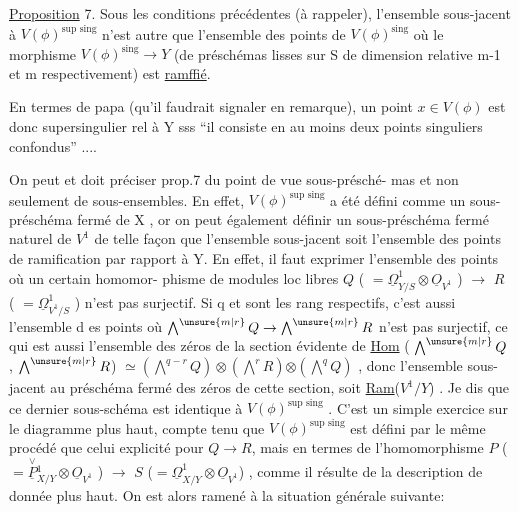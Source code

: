 
\uline{Proposition} 7. Sous les conditions précédentes (à rappeler), l'ensemble
sous-jacent à $V(\phi)^{\text{sup sing}}$ n'est autre que l'ensemble des points de
$V(\phi)^{\text{sing}}$  où le morphisme $V(\phi)^{\text{sing}}\longrightarrow Y$ (de préschémas lisses
sur S de dimension relative m-1 et m respectivement) est \uline{ramffié}.

En termes de papa (qu'il faudrait signaler en remarque), un point
$x \in V(\phi)$ est donc supersingulier rel à Y sss ``il consiste en au
moins deux points singuliers confondus'' ....

On peut et doit préciser prop.7 du point de vue   sous-présché-%
mas et non seulement de sous-ensembles. En effet, $V(\phi)^{\text{sup sing}}$ a été
défini comme un sous-préschéma fermé de X , or on peut également définir
un sous-préschéma fermé naturel de $V^1$ de telle façon que l'ensemble
sous-jacent soit l'ensemble des points de ramification par rapport à Y.
En effet, il faut exprimer l'ensemble des points où un certain homomor-%
phisme de modules loc libres $Q$ ( $=\underline{\Omega}^1_{Y/S}\otimes\underline{O}_{V^1}$ ) $\longrightarrow$ $R$ ( $=\underline{\Omega}^1_{V^1/S}$ )
n'est pas surjectif. Si q et  sont les rang respectifs, c'est aussi
l'ensemble d es points où $\bigwedge^{\unsure{m|r}} Q \rightarrow \bigwedge^{\unsure{m|r}} R$ n'est pas surjectif, ce qui est
aussi l'ensemble des zéros de la section évidente de \uline{Hom} ( $\bigwedge^{\unsure{m|r}} Q$ , $\bigwedge^{\unsure{m|r}} R$)
$\simeq (\bigwedge^{q-r} Q)\otimes(\bigwedge^{r} R)$$\otimes(\bigwedge^{q} Q)$\hand{$^{\vee}$} , donc l'ensemble sous-jacent au préschéma
fermé des zéros de cette section, soit \uline{Ram}($V^1/Y$) . Je dis que ce dernier
sous-schéma est identique à $V(\phi)^{\text{sup sing}}$ . C'est un simple exercice
sur le diagramme plus haut, compte tenu que $V(\phi)^{\text{sup sing}}$ est défini
par le même procédé que celui explicité pour $Q\longrightarrow R$, mais en termes de
l'homomorphisme $P$ ( $= \overset{\vee}{\underline{P}}{}^1_{X/Y}\otimes\underline{O}_{V^1}$ ) $\longrightarrow$ $S$ ($=\underline{\Omega}^1_{X/Y}\otimes\underline{O}_{V^1}$) , comme
il résulte de la description de \hand{$\mu$} donnée plus haut. On est alors
ramené à la situation générale suivante:

